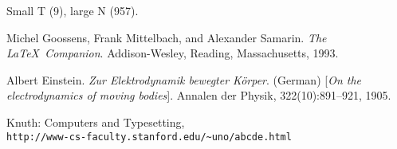 \documentclass[11pt]{article}
\begin{document}
Small T (9), large N (957). 


\begin{thebibliography}{9}

Michel Goossens, Frank Mittelbach, and Alexander Samarin. 
\textit{The \LaTeX\ Companion}. 
Addison-Wesley, Reading, Massachusetts, 1993.

Albert Einstein. 
\textit{Zur Elektrodynamik bewegter K{\"o}rper}. (German) 
[\textit{On the electrodynamics of moving bodies}]. 
Annalen der Physik, 322(10):891–921, 1905.

Knuth: Computers and Typesetting,
\\\texttt{http://www-cs-faculty.stanford.edu/\~{}uno/abcde.html}
\end{thebibliography}
\end{document}
